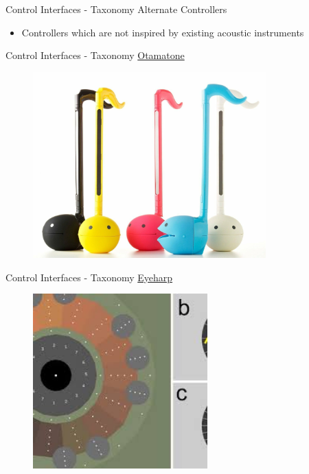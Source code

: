 \documentclass{beamer}
\begin{document}
\begin{frame}{Control Interfaces - Taxonomy}
   Alternate Controllers\\
   \vspace{5mm}
   \begin{itemize}
        \item Controllers which are not inspired by existing acoustic instruments 
    \end{itemize}
\end{frame}

\begin{frame}{Control Interfaces - Taxonomy}
    \href{https://www.youtube.com/watch?v=IxMBkwS6Ubg}{Otamatone}
    \begin{figure}[h]
        \includegraphics[width=0.8\textwidth]{otamatone.jpg}
    \end{figure}
\end{frame}

\begin{frame}{Control Interfaces - Taxonomy}
    \href{https://www.youtube.com/watch?v=PICmdczYowM}{Eyeharp}
    \begin{figure}[h]
        \includegraphics[width=0.6\textwidth]{eyeharp.jpeg}
    \end{figure}
\end{frame}
\end{document}
